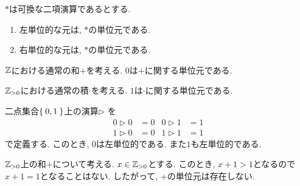 \begin{cor}
  $\ast$は可換な二項演算であるとする.
  \begin{enumerate}
  \item 左単位的な元は, $\ast$の単位元である.
  \item 右単位的な元は, $\ast$の単位元である.
  \end{enumerate}
\end{cor}
\begin{example}
  $\mathbb{Z}$における通常の和$+$を考える.
  $0$は$+$に関する単位元である.
\end{example}
\begin{example}
  $\mathbb{Z}_{>0}$における通常の積$\cdot$を考える.
  $1$は$\cdot$に関する単位元である.
\end{example}

\begin{example}
  二点集合$\Set{0,1}$上の演算$\rhd$
  を
  \begin{align*}
    0\rhd 0 &= 0&
    0\rhd 1 &= 1\\
    1\rhd 0 &= 0&
    1\rhd 1 &= 1
  \end{align*}
  で定義する.
  このとき, $0$は左単位的である.
  また$1$も左単位的である.
\end{example}

\begin{nonexample}
  $\mathbb{Z}_{>0}$上の和$+$について考える.
  $x\in\mathbb{Z}_{>0}$とする.
  このとき, 
  $x+1>1$となるので$x+1=1$となることはない.
  したがって, $+$の単位元は存在しない.
\end{nonexample}


